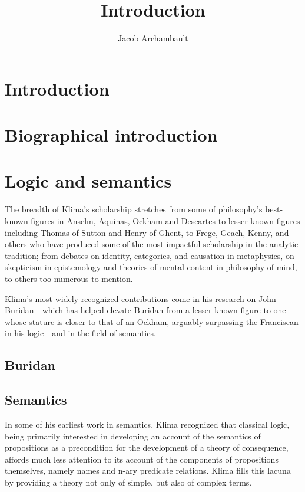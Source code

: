\documentclass[]{article}
\title{Introduction}
\author{Jacob Archambault}
\begin{document}
\maketitle

\begin{abstract}

\end{abstract}

\section{Introduction}
\section{Biographical introduction}
\section{Logic and semantics}
The breadth of Klima's scholarship stretches from some of philosophy's best-known figures in Anselm, Aquinas, Ockham and Descartes 
to lesser-known figures including Thomas of Sutton and Henry of Ghent, 
to Frege, Geach, Kenny, and others who have produced some of the most impactful scholarship in the analytic tradition; 
from debates on identity, categories, and causation in metaphysics, 
on skepticism in epistemology and theories of mental content in philosophy of mind, to others too numerous to mention.

Klima's most widely recognized contributions come in his research on John Buridan - which has helped elevate Buridan from a lesser-known figure to one whose stature is closer to that of an Ockham, arguably surpassing the Franciscan in his logic - and in the field of semantics. 
\subsection{Buridan}

\subsection{Semantics}
In some of his earliest work in semantics, 
Klima recognized that classical logic, 
being primarily interested in developing an account of the semantics of propositions as a precondition for the development of a theory of consequence, 
affords much less attention to its account of the components of propositions themselves, 
namely names and n-ary predicate relations. 
Klima fills this lacuna by providing a theory not only of simple, but also of complex terms. 
\end{document}
